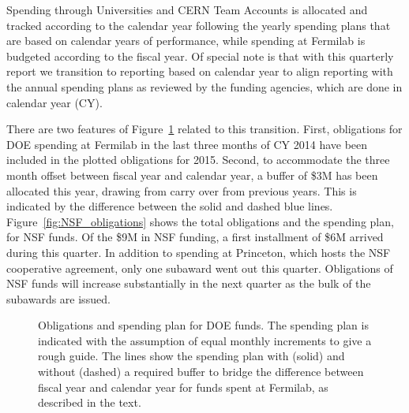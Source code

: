 Spending through Universities and CERN Team Accounts is allocated and tracked according to the calendar year following the yearly spending plans that are based on calendar years of performance, while spending at Fermilab is budgeted according to the fiscal year.  Of special note is that with this quarterly report we transition to reporting based on calendar year to align reporting with the annual spending plans as reviewed by the funding agencies, which are done in calendar year (CY).

There are two features of Figure\ \ref{fig:DOE_obligations} related to this transition. First, obligations for DOE spending at Fermilab in the last three months of CY 2014 have been included in the plotted obligations for 2015.  Second, to accommodate the three month offset between fiscal year and calendar year, a buffer of \$3M has been allocated this year, drawing from carry over from previous years.  This is indicated by the difference between the solid and dashed blue lines.  Figure\ \ref{fig:NSF_obligations} shows the total obligations and the spending plan, for NSF funds.  Of the \$9M in NSF funding, a first installment of \$6M arrived during this quarter.  In addition to spending at Princeton, which hosts the NSF cooperative agreement, only one subaward went out this quarter.  Obligations of NSF funds will increase substantially in the next quarter as the bulk of the subawards are issued.

\begin{figure}[hbtp]
  \begin{center}
    \caption{Obligations and spending plan for DOE funds.  The spending plan
is indicated with the assumption of equal monthly increments to give a rough guide.
The lines show the spending plan with (solid) and without (dashed) a required
buffer to bridge the difference between fiscal year and calendar year for
funds spent at Fermilab, as described in the text.}
    \label{fig:DOE_obligations}
  \end{center}
\end{figure}


